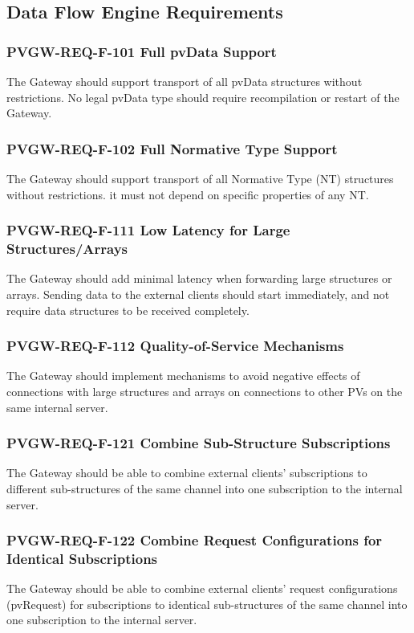 \documentclass[11pt
  , a4paper
  , article
  , oneside
]{memoir}
\begin{document}
\subsection{Data Flow Engine Requirements}

\subsubsection{PVGW-REQ-F-101 Full pvData Support}
The Gateway should support transport of all pvData structures without restrictions. No legal pvData type should require recompilation or restart of the Gateway.

\subsubsection{PVGW-REQ-F-102 Full Normative Type Support}
The Gateway should support transport of all Normative Type (NT) structures without restrictions. it must not depend on specific properties of any NT.

\subsubsection{PVGW-REQ-F-111 Low Latency for Large Structures/Arrays}
The Gateway should add minimal latency when forwarding large structures or arrays. Sending data to the external clients should start immediately, and not require data structures to be received completely.

\subsubsection{PVGW-REQ-F-112 Quality-of-Service Mechanisms}
The Gateway should implement mechanisms to avoid negative effects of connections with large structures and arrays on connections to other PVs on the same internal server.

\subsubsection{PVGW-REQ-F-121 Combine Sub-Structure Subscriptions}
The Gateway should be able to combine external clients' subscriptions to different sub-structures of the same channel into one subscription to the internal server.

\subsubsection{PVGW-REQ-F-122 Combine Request Configurations for Identical Subscriptions}
The Gateway should be able to combine external clients' request configurations (pvRequest) for subscriptions to identical sub-structures of the same channel into one subscription to the internal server.
\end{document}
